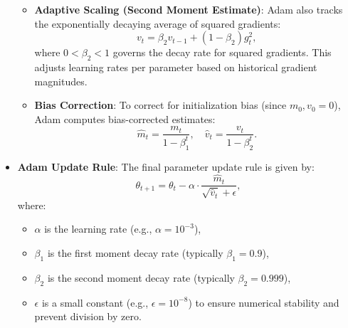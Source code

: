 \documentclass[12pt]{article}
\theoremstyle{definition}
\begin{document}
\begin{itemize}
\begin{itemize}
        \item \textbf{Adaptive Scaling (Second Moment Estimate)}: Adam also tracks the exponentially decaying average of squared gradients:
        \[
        v_t = \beta_2 v_{t-1} + (1 - \beta_2) g_t^2,
        \]
        where $0 < \beta_2 < 1$ governs the decay rate for squared gradients. This adjusts learning rates per parameter based on historical gradient magnitudes.

        \item \textbf{Bias Correction}: To correct for initialization bias (since $m_0, v_0 = 0$), Adam computes bias-corrected estimates:
        \[
        \hat{m}_t = \frac{m_t}{1 - \beta_1^t}, \quad \hat{v}_t = \frac{v_t}{1 - \beta_2^t}.
        \]
    \end{itemize}

    \item \textbf{Adam Update Rule}: The final parameter update rule is given by:
    \[
    \theta_{t+1} = \theta_t - \alpha \cdot \frac{\hat{m}_t}{\sqrt{\hat{v}_t} + \epsilon},
    \]
    where:
    \begin{itemize}
        \item $\alpha$ is the learning rate (e.g., $\alpha = 10^{-3}$),
        \item $\beta_1$ is the first moment decay rate (typically $\beta_1 = 0.9$),
        \item $\beta_2$ is the second moment decay rate (typically $\beta_2 = 0.999$),
        \item $\epsilon$ is a small constant (e.g., $\epsilon = 10^{-8}$) to ensure numerical stability and prevent division by zero.
    \end{itemize}

\end{itemize}

\newpage




\end{document}
